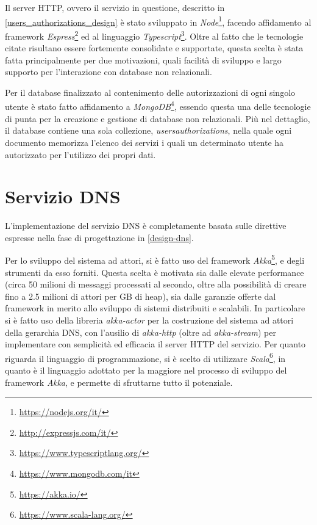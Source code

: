 \documentclass[a4paper,12pt]{report}
\begin{document}
Il server HTTP, ovvero il servizio in questione, descritto in \autoref{users_authorizations_design} è stato sviluppato in \emph{Node}\footnote{\url{https://nodejs.org/it/}}, facendo affidamento al framework \emph{Espress}\footnote{\url{http://expressjs.com/it/}} ed al linguaggio \emph{Typescript}\footnote{\url{https://www.typescriptlang.org/}}. Oltre al fatto che le tecnologie citate risultano essere fortemente consolidate e supportate, questa scelta è stata fatta principalmente per due motivazioni, quali facilità di sviluppo e largo supporto per l'interazione con database non relazionali.

Per il database finalizzato al contenimento delle autorizzazioni di ogni singolo utente è stato fatto affidamento a \emph{MongoDB}\footnote{\url{https://www.mongodb.com/it}}, essendo questa una delle tecnologie di punta per la creazione e gestione di database non relazionali. Più nel dettaglio, il database contiene una sola collezione, \emph{usersauthorizations}, nella quale ogni documento memorizza l'elenco dei servizi i quali un determinato utente ha autorizzato per l'utilizzo dei propri dati.   

\section{Servizio DNS}
L'implementazione del servizio DNS è completamente basata sulle direttive espresse nella fase di progettazione in \autoref{design-dns}. 

Per lo sviluppo del sistema ad attori, si è fatto uso del
framework \emph{Akka}\footnote{\url{https://akka.io/}}, e degli strumenti da esso forniti. Questa scelta è motivata sia dalle elevate performance (circa 50 milioni di messaggi processati al secondo, oltre alla possibilità di creare fino a 2.5 milioni di attori per GB di heap), sia dalle garanzie offerte dal framework in merito allo sviluppo di sistemi distribuiti e scalabili. In particolare si è fatto uso della libreria \emph{akka-actor} per la costruzione del sistema ad attori della gerarchia DNS, con l'ausilio di \emph{akka-http} (oltre ad \emph{akka-stream}) per implementare con semplicità ed efficacia il server HTTP del servizio. Per quanto riguarda il linguaggio di programmazione, si è scelto di utilizzare \emph{Scala}\footnote{\url{https://www.scala-lang.org/}}, in quanto è il linguaggio adottato per la maggiore nel processo di sviluppo del framework \emph{Akka}, e permette di sfruttarne tutto il 
potenziale.
\end{document}
